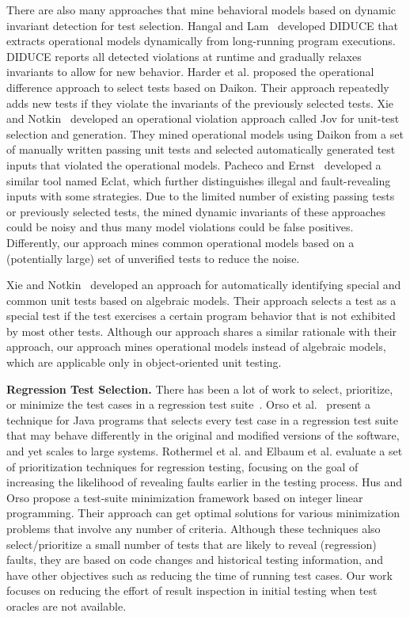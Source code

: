 \documentclass{sig-alternate}
\begin{document}
There are also many approaches that mine behavioral models based on
dynamic invariant detection for test selection. Hangal and
Lam~\cite{Hangal02} developed DIDUCE that extracts operational
models dynamically from long-running program executions. DIDUCE
reports all detected violations at runtime and gradually relaxes
invariants to allow for new behavior. Harder et al. \cite{Harder03}
proposed the operational difference approach to select tests based
on Daikon. Their approach repeatedly adds new tests if they violate
the invariants of the previously selected tests. Xie and
Notkin~\cite{Xie03} developed an operational violation approach
called Jov for unit-test selection and generation. They mined
operational models using Daikon from a set of manually written
passing unit tests and selected automatically generated test inputs
that violated the operational models. Pacheco and
Ernst~\cite{Pacheco05} developed a similar tool named Eclat, which
further distinguishes illegal and fault-revealing inputs with some
strategies. Due to the limited number of existing passing tests or
previously selected tests, the mined dynamic invariants of these
approaches could be noisy and thus many model violations could be
false positives. Differently, our approach mines common operational
models based on a (potentially large) set of unverified tests to
reduce the noise.

Xie and Notkin~\cite{Xie05} developed an approach for automatically
identifying special and common unit tests based on algebraic models.
Their approach selects a test as a special test if the test
exercises a certain program behavior that is not exhibited by most
other tests. Although our approach shares a similar rationale with
their approach, our approach mines operational models instead of
algebraic models, which are applicable only in object-oriented unit
testing.


\textbf{Regression Test Selection.} There has been a lot of work to
select, prioritize, or minimize the test cases in a regression test
suite~\cite{Elbaum02,Hsu09,Orso04,Rothermel01}. Orso et
al.~\cite{Orso04} present a technique for Java programs that selects
every test case in a regression test suite that may behave
differently in the original and modified versions of the software,
and yet scales to large systems. Rothermel et al. \cite{Rothermel01}
and Elbaum et al. \cite{Elbaum02} evaluate a set of prioritization
techniques for regression testing, focusing on the goal of
increasing the likelihood of revealing faults earlier in the testing
process. Hus and Orso \cite{Hsu09} propose a test-suite minimization
framework based on integer linear programming. Their approach can
get optimal solutions for various minimization problems that involve
any number of criteria. Although these techniques also
select/prioritize a small number of tests that are likely to reveal
(regression) faults, they are based on code changes and historical
testing information, and have other objectives such as reducing the
time of running test cases. Our work focuses on reducing the effort
of result inspection in initial testing when test oracles are not
available.
\end{document}
